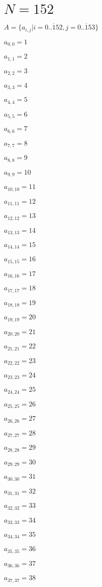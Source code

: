 \documentclass[a4paper,12pt]{article}
\begin{document}
\section{ $N = 152$ }
$A = \{ a _{ i, j } | i = \overline { 0..152 }, j = \overline { 0..153 } \}$

$a _{ 0, 0 } = 1$

$a _{ 1, 1 } = 2$

$a _{ 2, 2 } = 3$

$a _{ 3, 3 } = 4$

$a _{ 4, 4 } = 5$

$a _{ 5, 5 } = 6$

$a _{ 6, 6 } = 7$

$a _{ 7, 7 } = 8$

$a _{ 8, 8 } = 9$

$a _{ 9, 9 } = 10$

$a _{ 10, 10 } = 11$

$a _{ 11, 11 } = 12$

$a _{ 12, 12 } = 13$

$a _{ 13, 13 } = 14$

$a _{ 14, 14 } = 15$

$a _{ 15, 15 } = 16$

$a _{ 16, 16 } = 17$

$a _{ 17, 17 } = 18$

$a _{ 18, 18 } = 19$

$a _{ 19, 19 } = 20$

$a _{ 20, 20 } = 21$

$a _{ 21, 21 } = 22$

$a _{ 22, 22 } = 23$

$a _{ 23, 23 } = 24$

$a _{ 24, 24 } = 25$

$a _{ 25, 25 } = 26$

$a _{ 26, 26 } = 27$

$a _{ 27, 27 } = 28$

$a _{ 28, 28 } = 29$

$a _{ 29, 29 } = 30$

$a _{ 30, 30 } = 31$

$a _{ 31, 31 } = 32$

$a _{ 32, 32 } = 33$

$a _{ 33, 33 } = 34$

$a _{ 34, 34 } = 35$

$a _{ 35, 35 } = 36$

$a _{ 36, 36 } = 37$

$a _{ 37, 37 } = 38$
\end{document}
